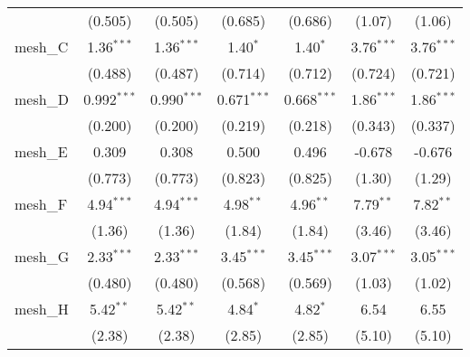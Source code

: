 \begin{tabular}{lcccccc}
                                                               & (0.505)        & (0.505)        & (0.685)        & (0.686)        & (1.07)         & (1.06)\\   
   mesh\_C                                                     & 1.36$^{***}$   & 1.36$^{***}$   & 1.40$^{*}$     & 1.40$^{*}$     & 3.76$^{***}$   & 3.76$^{***}$\\   
                                                               & (0.488)        & (0.487)        & (0.714)        & (0.712)        & (0.724)        & (0.721)\\   
   mesh\_D                                                     & 0.992$^{***}$  & 0.990$^{***}$  & 0.671$^{***}$  & 0.668$^{***}$  & 1.86$^{***}$   & 1.86$^{***}$\\   
                                                               & (0.200)        & (0.200)        & (0.219)        & (0.218)        & (0.343)        & (0.337)\\   
   mesh\_E                                                     & 0.309          & 0.308          & 0.500          & 0.496          & -0.678         & -0.676\\   
                                                               & (0.773)        & (0.773)        & (0.823)        & (0.825)        & (1.30)         & (1.29)\\   
   mesh\_F                                                     & 4.94$^{***}$   & 4.94$^{***}$   & 4.98$^{**}$    & 4.96$^{**}$    & 7.79$^{**}$    & 7.82$^{**}$\\   
                                                               & (1.36)         & (1.36)         & (1.84)         & (1.84)         & (3.46)         & (3.46)\\   
   mesh\_G                                                     & 2.33$^{***}$   & 2.33$^{***}$   & 3.45$^{***}$   & 3.45$^{***}$   & 3.07$^{***}$   & 3.05$^{***}$\\   
                                                               & (0.480)        & (0.480)        & (0.568)        & (0.569)        & (1.03)         & (1.02)\\   
   mesh\_H                                                     & 5.42$^{**}$    & 5.42$^{**}$    & 4.84$^{*}$     & 4.82$^{*}$     & 6.54           & 6.55\\   
                                                               & (2.38)         & (2.38)         & (2.85)         & (2.85)         & (5.10)         & (5.10)\\   

\end{tabular}
